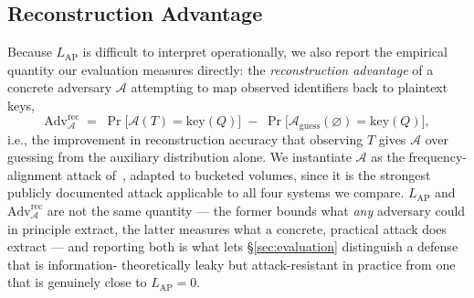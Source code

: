 \subsection{Reconstruction Advantage}
Because $L_{\mathrm{AP}}$ is difficult to interpret operationally, we also
report the empirical quantity our evaluation measures directly: the
\emph{reconstruction advantage} of a concrete adversary $\mathcal{A}$
attempting to map observed identifiers back to plaintext keys,
\begin{equation}
  \label{eq:advantage}
  \mathrm{Adv}^{\mathrm{rec}}_{\mathcal{A}} \;=\;
  \Pr\big[\mathcal{A}(T) = \mathrm{key}(Q)\big] \;-\;
  \Pr\big[\mathcal{A}_{\mathrm{guess}}(\varnothing) = \mathrm{key}(Q)\big],
\end{equation}
i.e., the improvement in reconstruction accuracy that observing $T$ gives
$\mathcal{A}$ over guessing from the auxiliary distribution alone. We
instantiate $\mathcal{A}$ as the frequency-alignment attack
of~\citet{kellaris2016generic}, adapted to bucketed volumes, since it is
the strongest publicly documented attack applicable to all four systems we
compare. $L_{\mathrm{AP}}$ and $\mathrm{Adv}^{\mathrm{rec}}_{\mathcal{A}}$
are not the same quantity --- the former bounds what \emph{any} adversary
could in principle extract, the latter measures what a concrete, practical
attack does extract --- and reporting both is what lets
\S\ref{sec:evaluation} distinguish a defense that is information-
theoretically leaky but attack-resistant in practice from one that is
genuinely close to $L_{\mathrm{AP}} = 0$.
